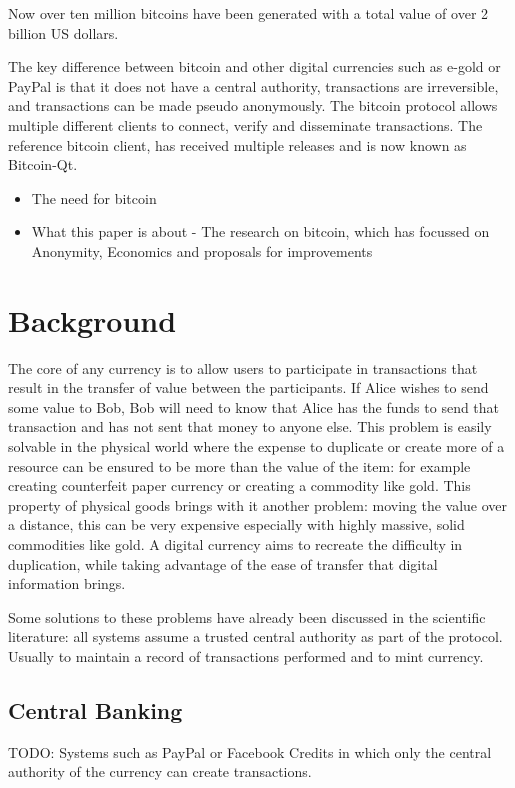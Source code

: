 Now over ten million bitcoins have been generated with a total value of over 2 billion US dollars.

The key difference between bitcoin and other digital currencies such as e-gold or PayPal is that it does not have a central authority, transactions are irreversible, and transactions can be made pseudo anonymously.  The bitcoin protocol allows multiple different clients to connect, verify and disseminate transactions.  The reference bitcoin client, has received multiple releases and is now known as Bitcoin-Qt.

\begin{itemize}
    \item The need for bitcoin
    \item What this paper is about - The research on bitcoin, which has focussed on Anonymity, Economics and proposals for improvements
\end{itemize}

\section{Background}
The core of any currency is to allow users to participate in transactions that result in the transfer of value between the participants.  If Alice wishes to send some value to Bob, Bob will need to know that Alice has the funds to send that transaction and has not sent that money to anyone else.  This problem is easily solvable in the physical world where the expense to duplicate or create more of a resource can be ensured to be more than the value of the item: for example creating counterfeit paper currency or creating a commodity like gold.  This property of physical goods brings with it another problem: moving the value over a distance, this can be very expensive especially with highly massive, solid commodities like gold.  A digital currency aims to recreate the difficulty in duplication, while taking advantage of the ease of transfer that digital information brings.

Some solutions to these problems have already been discussed in the scientific literature: all systems assume a trusted central authority as part of the protocol. Usually to maintain a record of transactions performed and to mint currency.

\subsection{Central Banking}
TODO: Systems such as PayPal or Facebook Credits in which only the central authority of the currency can create transactions.

